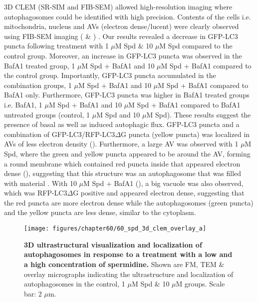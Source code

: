 3D CLEM (SR-SIM and FIB-SEM) allowed high-resolution imaging where autophagosomes could be identified with high precision. Contents of the cells i.e. mitochondria, nucleus and AVs (electron dense/lucent) were clearly observed using FIB-SEM imaging ( \& ) . Our results revealed a decrease in GFP-LC3 puncta following treatment with 1 $\mu$M Spd \& 10 $\mu$M Spd compared to the control group. Moreover, an increase in GFP-LC3 puncta was observed in the BafA1 treated group, 1 $\mu$M Spd + BafA1 and 10 $\mu$M Spd + BafA1 compared to the control group. Importantly, GFP-LC3 puncta accumulated in the combination groups, 1 $\mu$M Spd + BafA1 and 10 $\mu$M Spd + BafA1 compared to BafA1 only. Furthermore, GFP-LC3 puncta was higher in BafA1 treated groups i.e. BafA1, 1 $\mu$M Spd + BafA1 and 10 $\mu$M Spd + BafA1 compared to BafA1 untreated groups (control, 1 $\mu$M Spd and 10 $\mu$M Spd). These results suggest the presence of basal as well as induced autophagic flux. GFP-LC3 puncta and a combination of GFP-LC3/RFP-LC3$\Delta$G puncta (yellow puncta) was localized in AVs of less electron density (). Furthermore, a large AV was observed with 1 $\mu$M Spd, where the green and yellow puncta appeared to be around the AV, forming a round membrane which contained red puncta inside that appeared electron dense (), suggesting that this structure was an autophagosome that was filled with material . With 10 $\mu$M Spd + BafA1 (), a big vacuole was also observed, which was RFP-LC3$\Delta$G positive and appeared electron dense, suggesting that the red puncta are more electron dense while the autophagosomes (green puncta) and the yellow puncta are less dense, similar to the cytoplasm. 

\begin{landscape}
\begin{figure}[!htbp]
\center
  \texttt{[image: figures/chapter60/60\_spd\_3d\_clem\_overlay\_a]}
  \caption[3D ultrastructural visualization and localization of autophagosomes in response to a treatment with a low and a high concentration of spermidine]{\textbf{3D ultrastructural visualization and localization of autophagosomes in response to a treatment with a low and a high concentration of spermidine.} Shown are FM, TEM \& overlay micrographs indicating the ultrastructure and localization of autophagosomes in the control, 1 $\mu$M Spd \& 10 $\mu$M groups. Scale bar: 2 $\mu$m.}
  \label{fig:60_spd_3d_clem_overlay_a}
\end{figure} 
\end{landscape}

